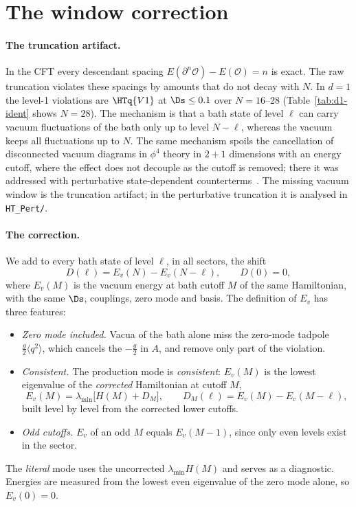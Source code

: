 \section{The window correction}\label{sec:window}

\paragraph{The truncation artifact.} In the CFT every descendant spacing $E(\partial^n\mathcal O)-E(\mathcal O)=n$
is exact. The raw truncation violates these spacings by amounts that do not decay with $N$. In $d=1$ the level-1
violations are $\HTq{V1}$ at $\Ds\le0.1$ over $N=16$--28 (Table~\ref{tab:d1-ident} shows $N=28$). The mechanism is that a bath state of level $\ell$ can carry
vacuum fluctuations of the bath only up to level $N-\ell$, whereas the vacuum keeps all fluctuations up to $N$. The
same mechanism spoils the cancellation of disconnected vacuum diagrams in $\phi^4$ theory in $2+1$ dimensions with an
energy cutoff, where the effect does not decouple as the cutoff is removed; there it was addressed with perturbative
state-dependent counterterms~\cite{Elias-Miro:2020qwz}. The missing vacuum window is the truncation artifact; in
the perturbative truncation it is analysed in \texttt{HT\_Pert/}.

\paragraph{The correction.} We add to every bath state of level $\ell$, in all sectors, the shift
\begin{equation}
 D(\ell)=E_v(N)-E_v(N-\ell),\qquad D(0)=0,
 \label{eq:window}
\end{equation}
where $E_v(M)$ is the vacuum energy at bath cutoff $M$ of the same Hamiltonian, with the same $\Ds$, couplings, zero
mode and basis. The definition of $E_v$ has three features:
\begin{itemize}
\item \emph{Zero mode included.} Vacua of the bath alone miss the zero-mode tadpole $\frac g2\langle q^2\rangle$,
 which cancels the $-\frac g2$ in $A$, and remove only part of the violation.
\item \emph{Consistent.} The production mode is \emph{consistent}: $E_v(M)$ is the lowest eigenvalue of the
 \emph{corrected} Hamiltonian at cutoff $M$,
 \begin{equation}
 E_v(M)=\lambda_{\min}\big[H(M)+D_M\big],\qquad D_M(\ell)=E_v(M)-E_v(M-\ell),
 \label{eq:Ev}
 \end{equation}
 built level by level from the corrected lower cutoffs.
\item \emph{Odd cutoffs.} $E_v$ of an odd $M$ equals $E_v(M-1)$, since only even levels exist in the sector.
\end{itemize}
The \emph{literal} mode uses the uncorrected $\lambda_{\min}H(M)$ and serves as a diagnostic. Energies are measured
from the lowest even eigenvalue of the zero mode alone, so $E_v(0)=0$.

